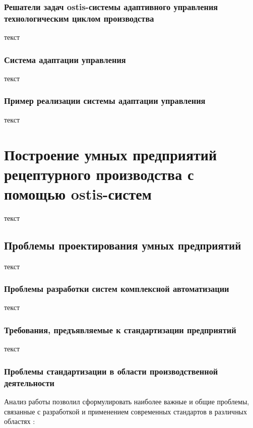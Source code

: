 \subsubsection{Решатели задач ostis-системы адаптивного управления технологическим циклом производства}

текст

\subsubsection{Система адаптации управления}

текст

\subsubsection{Пример реализации системы адаптации управления}

текст

\section{Построение умных предприятий рецептурного производства с помощью ostis-систем}

текст

\subsection{Проблемы проектирования умных предприятий}

текст

\subsubsection{Проблемы разработки систем комплексной автоматизации}

текст

\subsubsection{Требования, предъявляемые к стандартизации предприятий}

текст

\subsubsection{Проблемы стандартизации в области производственной деятельности}

Анализ работы позволил сформулировать наиболее важные и общие проблемы, связанные с разработкой и применением современных стандартов в различных областях \cite{Серенков-2004,Углев-2012}:

